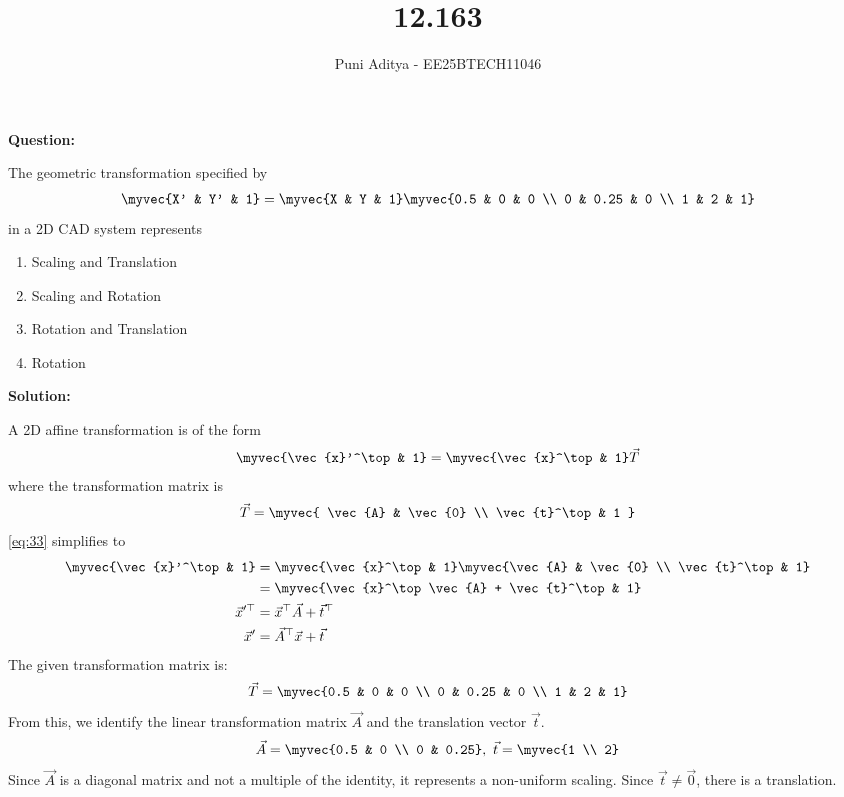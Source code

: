 \documentclass[journal]{IEEEtran}
\begin{document}
\title{12.163}
\author{Puni Aditya - EE25BTECH11046}
\maketitle

\textbf{Question:}

The geometric transformation specified by
\begin{align*}
    \myvec{X' & Y' & 1} = \myvec{X & Y & 1} \myvec{0.5 & 0 & 0 \\ 0 & 0.25 & 0 \\ 1 & 2 & 1}
\end{align*}
in a 2D CAD system represents
\begin{enumerate}
    \item Scaling and Translation
    \item Scaling and Rotation
    \item Rotation and Translation
    \item Rotation
\end{enumerate}

\textbf{Solution:}

A 2D affine transformation is of the form 
\begin{align}
\myvec{\vec{x}'^\top & 1} = \myvec{\vec{x}^\top & 1}\vec{T} \label{eq:33}
\end{align}
where the transformation matrix is
\begin{align*}
    \vec{T} = \myvec{
        \vec{A} & \vec{0} \\
        \vec{t}^\top & 1
    }
\end{align*}
\eqref{eq:33} simplifies to
\begin{align}
	\myvec{\vec{x}'^\top & 1} &= \myvec{\vec{x}^\top & 1}\myvec{\vec{A} & \vec{0} \\ \vec{t}^\top & 1} \\
	&= \myvec{\vec{x}^\top\vec{A} + \vec{t}^\top & 1} \\
	\vec{x}'^\top &= \vec{x}^\top\vec{A} + \vec{t}^\top \\
	\vec{x}' &= \vec{A}^\top\vec{x} + \vec{t} \label{eq:47}
\end{align}
The given transformation matrix is:
\begin{align}
    \vec{T} = \myvec{0.5 & 0 & 0 \\ 0 & 0.25 & 0 \\ 1 & 2 & 1}
\end{align}
From this, we identify the linear transformation matrix $\vec{A}$ and the translation vector $\vec{t}$.
\begin{align}
    \vec{A} = \myvec{0.5 & 0 \\ 0 & 0.25}, \text{ } \vec{t} = \myvec{1 \\ 2}
\end{align}
Since $\vec{A}$ is a diagonal matrix and not a multiple of the identity, it represents a non-uniform scaling. Since $\vec{t} \neq \vec{0}$, there is a translation.
\end{document}
